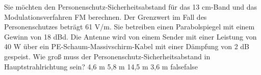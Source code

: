     {Sie möchten den Personenschutz-Sicherheitsabstand für das 13 cm-Band und das Modulationsverfahren FM berechnen. Der Grenzwert im Fall des Personenschutzes beträgt 61 V/m. Sie betreiben einen Parabolspiegel mit einem Gewinn von 18 dBd. Die Antenne wird von einem Sender mit einer Leistung von 40 W über ein PE-Schaum-Massivschirm-Kabel mit einer Dämpfung von 2 dB gespeist. Wie groß muss der Personenschutz-Sicherheitsabstand in Hauptstrahlrichtung sein?}
    {4,6 m}
    {5,8 m}
    {14,5 m}
    {3,6 m}
    {false}{false}